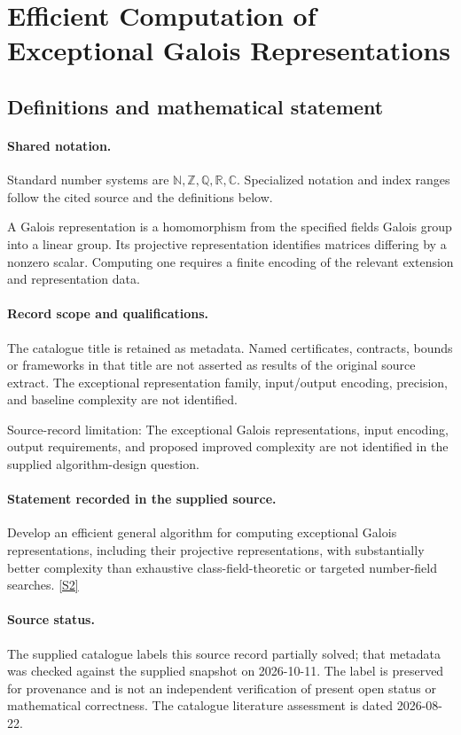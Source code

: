 \documentclass[11pt]{article}
\newcommand{\sref}[2]{\hyperlink{source:#1:#2}{[S#2]}}
\begin{document}
\section{Efficient Computation of Exceptional Galois Representations}\label{statement}

\subsection{Definitions and mathematical statement}

\paragraph{Shared notation.}Standard number systems are $\mathbb N,\mathbb Z,\mathbb Q,\mathbb R,\mathbb C$. Specialized notation and index ranges follow the cited source and the definitions below.


A Galois representation is a homomorphism from the specified field\textquotesingle s Galois group into a linear group. Its projective representation identifies matrices differing by a nonzero scalar. Computing one requires a finite encoding of the relevant extension and representation data.
\paragraph{Record scope and qualifications.}
The catalogue title is retained as metadata. Named certificates, contracts, bounds or frameworks in that title are not asserted as results of the original source extract.
The exceptional representation family, input/output encoding, precision, and baseline complexity are not identified.

Source-record limitation: The exceptional Galois representations, input encoding, output requirements, and proposed improved complexity are not identified in the supplied algorithm-design question.
\paragraph{Statement recorded in the supplied source.}
Develop an efficient general algorithm for computing exceptional Galois representations, including their projective representations, with substantially better complexity than exhaustive class-field-theoretic or targeted number-field searches. \sref{statement}{2}
\paragraph{Source status.}
The supplied catalogue labels this source record partially solved; that metadata was checked against the supplied snapshot on 2026-10-11. The label is preserved for provenance and is not an independent verification of present open status or mathematical correctness. The catalogue literature assessment is dated 2026-08-22.
\end{document}

